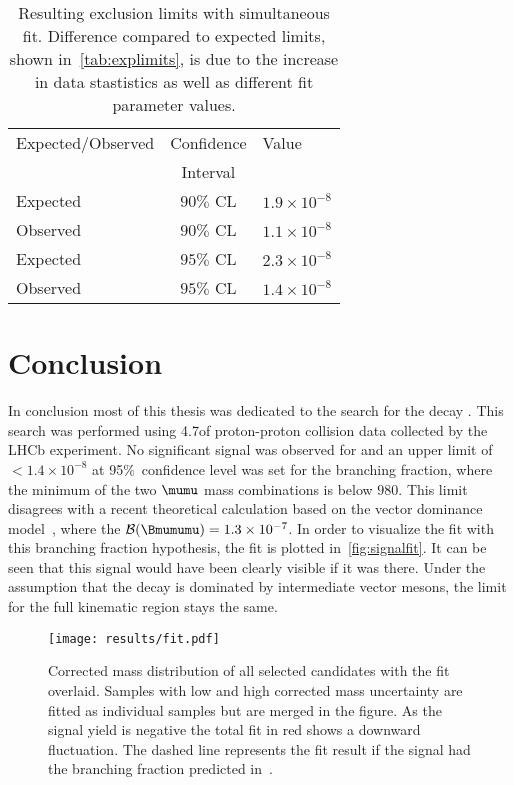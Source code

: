 \begin{table}[H]
\centering
\begin{tabular}{ l  c  l  }
\toprule
Expected/Observed & Confidence & Value  \\ 
 & Interval &  \\ \hline
Expected & $90\%$ CL & $ 1.9\times 10^{-8}$ \\
Observed & $90\%$ CL & $ 1.1\times 10^{-8}$ \\
Expected & $95\%$ CL & $ 2.3\times 10^{-8}$ \\
Observed & $95\%$ CL & $ 1.4\times 10^{-8}$ \\
\bottomrule
\end{tabular}
\caption{Resulting exclusion limits with simultaneous fit. Difference compared to expected limits, shown in~\autoref{tab:explimits}, is due to the increase in data stastistics as well as different fit parameter values.}
\label{tab:limits}
\end{table}

\section{Conclusion}
In conclusion most of this thesis was dedicated to the search for the decay \Bmumumu.
This search was performed using 4.7\invfb of proton-proton collision data collected by the \gls{LHCb} experiment. No significant signal was observed for \Bmumumu and an upper limit of $< 1.4\times 10^{-8}$ at 95\%~confidence level was set for the branching fraction, where the minimum of the two $\mumu$ mass combinations is below $980$\mevcc. This limit disagrees with a recent theoretical calculation based on the vector dominance model~\cite{Danilina:2018uzr}, where the $\mathcal{B}(\Bmumumu)=1.3\times 10^{-7}$. In order to visualize the fit with this branching fraction hypothesis, the fit is plotted in~\autoref{fig:signalfit}. It can be seen that this signal would have been clearly visible if it was there. Under the assumption that the decay is dominated by intermediate vector mesons, the limit for the full kinematic region stays the same.


\begin{figure}[t]
  \centering
  \texttt{[image: results/fit.pdf]}
  \caption{Corrected mass distribution of all selected \Bmumumu
    candidates with the fit overlaid. Samples with low and high
    corrected mass uncertainty are fitted as individual samples but
    are merged in the figure. As the signal yield is negative the total fit
    in red shows a downward fluctuation. The dashed line represents the fit
    result if the signal had the branching fraction predicted in~\cite{Danilina:2018uzr}.}
  \label{fig:signalfit}
\end{figure}


